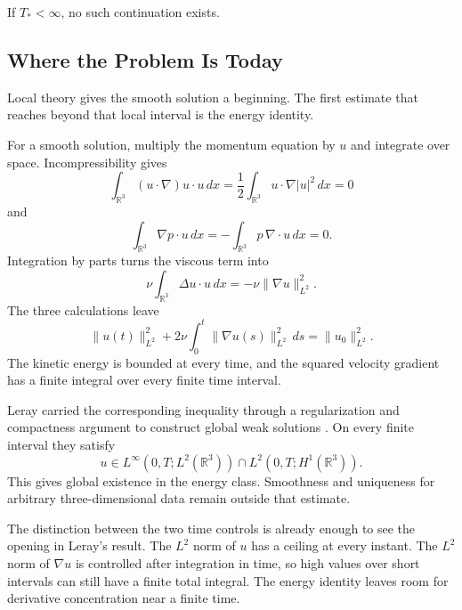 If \(T_*<\infty\), no such continuation exists.

\subsection{Where the Problem Is Today}\label{sub:HistoricalEstimates}

Local theory gives the smooth solution a beginning.
The first estimate that reaches beyond that local interval is the energy identity.

\newpage
{}

For a smooth solution, multiply the momentum equation by \(u\) and integrate over space.
Incompressibility gives
\[
  \int_{\mathbb R^3} (u\cdot\nabla)u\cdot u\,dx
  =
  \frac12\int_{\mathbb R^3} u\cdot\nabla |u|^2\,dx
  =
  0
\]
and
\[
  \int_{\mathbb R^3} \nabla p\cdot u\,dx
  =
  -\int_{\mathbb R^3} p\,\nabla\cdot u\,dx
  =
  0.
\]
Integration by parts turns the viscous term into
\[
  \nu\int_{\mathbb R^3} \Delta u\cdot u\,dx
  =
  -\nu\lVert\nabla u\rVert_{L^2}^{2}.
\]
The three calculations leave
\[
  \lVert u(t)\rVert_{L^2}^{2}
  +
  2\nu\int_0^t\lVert\nabla u(s)\rVert_{L^2}^{2}\,ds
  =
  \lVert u_0\rVert_{L^2}^{2}.
\]
The kinetic energy is bounded at every time, and the squared velocity gradient has a finite integral over every finite time interval.

Leray carried the corresponding inequality through a regularization and compactness argument to construct global weak solutions \parencite{Leray1934}.
On every finite interval they satisfy
\[
  u\in
  L^\infty(0,T;L^2(\mathbb R^3))
  \cap
  L^2(0,T;H^1(\mathbb R^3)).
\]
This gives global existence in the energy class.
Smoothness and uniqueness for arbitrary three-dimensional data remain outside that estimate.

The distinction between the two time controls is already enough to see the opening in Leray's result.
The \(L^2\) norm of \(u\) has a ceiling at every instant.
The \(L^2\) norm of \(\nabla u\) is controlled after integration in time, so high values over short intervals can still have a finite total integral.
The energy identity leaves room for derivative concentration near a finite time.

